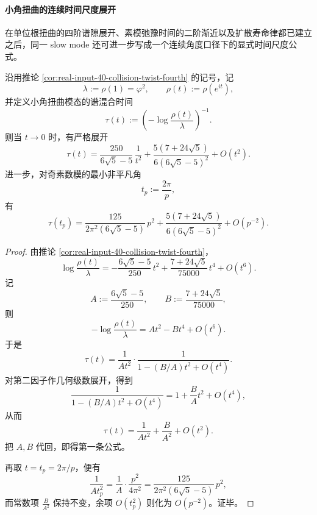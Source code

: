 \paragraph{小角扭曲的连续时间尺度展开}
在单位根扭曲的四阶谱隙展开、素模弛豫时间的二阶渐近以及扩散寿命律都已建立之后，同一 slow mode 还可进一步写成一个连续角度口径下的显式时间尺度公式。

\begin{theorem}[小角扭曲模态的谱混合时间具有显式二阶展开]\label{thm:xi-time-part9oe-small-angle-twist-mixingtime-second-order}
沿用推论 \ref{cor:real-input-40-collision-twist-fourth} 的记号，记
\[
\lambda:=\rho(1)=\varphi^2,
\qquad
\rho(t):=\rho(e^{it}),
\]
并定义小角扭曲模态的谱混合时间
\[
\tau(t):=\left(-\log\frac{\rho(t)}{\lambda}\right)^{-1}.
\]
则当 \(t\to 0\) 时，有严格展开
\[
\boxed{\;
\tau(t)
=
\frac{250}{6\sqrt5-5}\,\frac{1}{t^2}
+
\frac{5(7+24\sqrt5)}{6(6\sqrt5-5)^2}
+
O(t^2).\;}
\]
进一步，对奇素数模的最小非平凡角
\[
t_p:=\frac{2\pi}{p},
\]
有
\[
\boxed{\;
\tau(t_p)
=
\frac{125}{2\pi^2(6\sqrt5-5)}\,p^2
+
\frac{5(7+24\sqrt5)}{6(6\sqrt5-5)^2}
+
O(p^{-2}).\;}
\]
\end{theorem}
\begin{proof}
由推论 \ref{cor:real-input-40-collision-twist-fourth}，
\[
\log\frac{\rho(t)}{\lambda}
=
-\frac{6\sqrt5-5}{250}\,t^2
+
\frac{7+24\sqrt5}{75000}\,t^4
+
O(t^6).
\]
记
\[
A:=\frac{6\sqrt5-5}{250},
\qquad
B:=\frac{7+24\sqrt5}{75000},
\]
则
\[
-\log\frac{\rho(t)}{\lambda}=A t^2-B t^4+O(t^6).
\]
于是
\[
\tau(t)
=
\frac{1}{A t^2}\cdot\frac{1}{1-(B/A)t^2+O(t^4)}.
\]
对第二因子作几何级数展开，得到
\[
\frac{1}{1-(B/A)t^2+O(t^4)}
=
1+\frac{B}{A}t^2+O(t^4),
\]
从而
\[
\tau(t)=\frac{1}{A t^2}+\frac{B}{A^2}+O(t^2).
\]
把 \(A,B\) 代回，即得第一条公式。

再取 \(t=t_p=2\pi/p\)，便有
\[
\frac{1}{A t_p^2}
=
\frac{1}{A}\cdot\frac{p^2}{4\pi^2}
=
\frac{125}{2\pi^2(6\sqrt5-5)}\,p^2,
\]
而常数项 \(\frac{B}{A^2}\) 保持不变，余项 \(O(t_p^2)\) 则化为 \(O(p^{-2})\)。证毕。
\end{proof}

